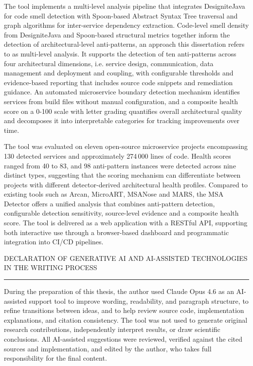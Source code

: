\documentclass[12pt]{report}
\begin{document}
\par The tool implements a multi-level analysis pipeline that integrates DesigniteJava for code smell detection with Spoon-based Abstract Syntax Tree traversal and graph algorithms for inter-service dependency extraction. Code-level smell density from DesigniteJava and Spoon-based structural metrics together inform the detection of architectural-level anti-patterns, an approach this dissertation refers to as multi-level analysis. It supports the detection of ten anti-patterns across four architectural dimensions, i.e. service design, communication, data management and deployment and coupling, with configurable thresholds and evidence-based reporting that includes source code snippets and remediation guidance. An automated microservice boundary detection mechanism identifies services from build files without manual configuration, and a composite health score on a 0-100 scale with letter grading quantifies overall architectural quality and decomposes it into interpretable categories for tracking improvements over time.

\par The tool was evaluated on eleven open-source microservice projects encompassing 130 detected services and approximately 274\,000 lines of code. Health scores ranged from 40 to 83, and 98 anti-pattern instances were detected across nine distinct types, suggesting that the scoring mechanism can differentiate between projects with different detector-derived architectural health profiles. Compared to existing tools such as Arcan, MicroART, MSANose and MARS, the MSA Detector offers a unified analysis that combines anti-pattern detection, configurable detection sensitivity, source-level evidence and a composite health score. The tool is delivered as a web application with a RESTful API, supporting both interactive use through a browser-based dashboard and programmatic integration into CI/CD pipelines.

\clearpage
DECLARATION OF GENERATIVE AI AND AI-ASSISTED TECHNOLOGIES IN THE WRITING PROCESS
\vspace{0.5cm}
\hrule
\vspace{0.5cm}

During the preparation of this thesis, the author used Claude Opus 4.6 as an AI-assisted support tool to improve wording, readability, and paragraph structure, to refine transitions between ideas, and to help review source code, implementation explanations, and citation consistency. The tool was not used to generate original research contributions, independently interpret results, or draw scientific conclusions. All AI-assisted suggestions were reviewed, verified against the cited sources and implementation, and edited by the author, who takes full responsibility for the final content.

\tableofcontents


\newpage
{}




%





\end{document}
